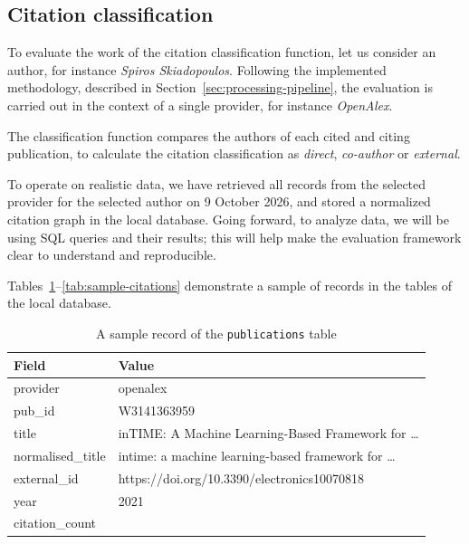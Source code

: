 \subsection{Citation classification} \label{sec:classification-checks}

To evaluate the work of the citation classification function, let us consider an author, for instance \emph{Spiros Skiadopoulos}.
Following the implemented methodology, described in Section~\ref{sec:processing-pipeline}, the evaluation is carried out in the context of a single provider, for instance \emph{OpenAlex}.

The classification function compares the authors of each cited and citing publication, to calculate the citation classification as \emph{direct}, \emph{co-author} or \emph{external}.

To operate on realistic data, we have retrieved all records from the selected provider for the selected author on 9 October 2026, and stored a normalized citation graph in the local database.
Going forward, to analyze data, we will be using SQL queries and their results; this will help make the evaluation framework clear to understand and reproducible.

Tables~\ref{tab:sample-publications}--\ref{tab:sample-citations} demonstrate a sample of records in the tables of the local database.


\begin{table}[tb]
    \centering
    \begin{tabular}{|l|l|}
        \hline
        Field & Value \\
        \hline\hline
        provider & openalex \\
        pub\_id & W3141363959 \\
        title & inTIME: A Machine Learning-Based Framework for \dots \\
        normalised\_title & intime: a machine learning-based framework for \dots \\
        external\_id & https://doi.org/10.3390/electronics10070818 \\
        year & 2021 \\
        citation\_count & \\
        \hline
    \end{tabular}
    \caption{A sample record of the \texttt{publications} table}
    \label{tab:sample-publications}
\end{table}

